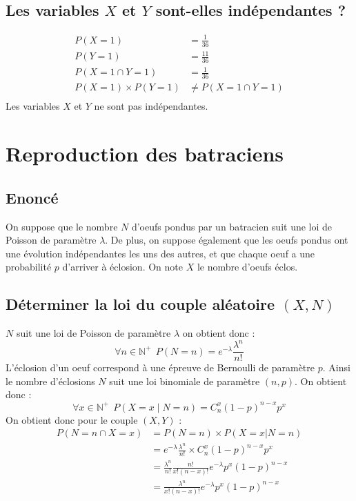 \documentclass[10pt,a4paper,twoside]{article}
\begin{document}
\subsection{Les variables $X$ et $Y$ sont-elles indépendantes ?}
\begin{align*}
P(X=1) &= \frac{1}{36}\\
P(Y=1) &= \frac{11}{36}\\
P(X=1\cap Y=1) &= \frac{1}{36}\\
P(X=1)\times P(Y=1) &\neq P(X=1\cap Y=1)\\
\end{align*}
Les variables $X$ et $Y$ ne sont pas indépendantes.

\section{Reproduction des batraciens}
\subsection*{Enoncé}
On suppose que le nombre $N$ d'oeufs pondus par un batracien suit une loi de Poisson de paramètre $\lambda$. De plus, on suppose également que les oeufs pondus ont une évolution indépendantes les uns des autres, et que chaque oeuf a une probabilité $p$ d'arriver à éclosion. On note $X$ le nombre d'oeufs éclos.

\subsection{Déterminer la loi du couple aléatoire $(X,N)$}
$N$ suit une loi de Poisson de paramètre $\lambda$ on obtient donc :
\[ \forall n \in \mathbb{N}^{+}\ \ P(N=n)=e^{-\lambda}\frac{\lambda^{n}}{n!}   \]
L'éclosion d'un oeuf correspond à une épreuve de Bernoulli de paramètre $p$. Ainsi le nombre d'éclosions $N$ suit une loi binomiale de paramètre $(n,p)$. On obtient donc :
\[ \forall x \in \mathbb{N}^{+}\ \ P(X=x\mid N=n)= C_{n}^{x} (1-p)^{n-x} p^{x} \]
On obtient donc pour le couple $(X,Y)$ :
\begin{align*}
P(N=n\cap X=x) &= P(N=n) \times P(X=x|N=n)\\
&= e^{-\lambda}\frac{\lambda^{n}}{n!}  \times C_{n}^{x} (1-p)^{n-x} p^{x}\\
&= \frac{\lambda^{n}}{n!}\frac{n!}{x!(n-x)!} e^{-\lambda} p^{x} (1-p)^{n-x}\\
&= \frac{\lambda^{n}}{x!(n-x)!}e^{-\lambda} p^{x} (1-p)^{n-x}\\
\end{align*}
\end{document}
